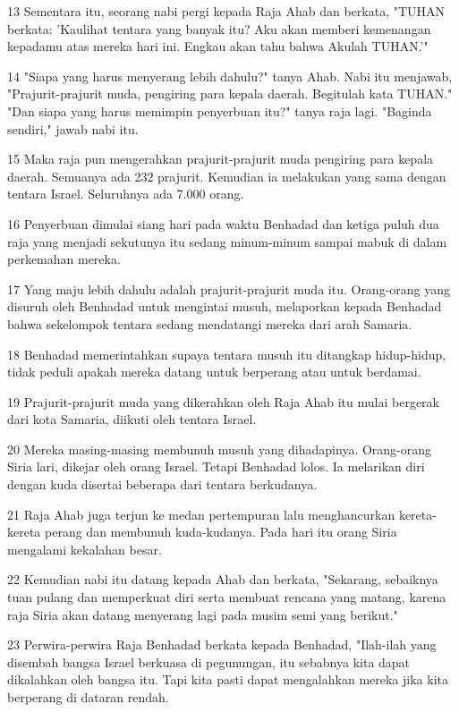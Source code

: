 \par 13 Sementara itu, seorang nabi pergi kepada Raja Ahab dan berkata, "TUHAN berkata: 'Kaulihat tentara yang banyak itu? Aku akan memberi kemenangan kepadamu atas mereka hari ini. Engkau akan tahu bahwa Akulah TUHAN.'"
\par 14 "Siapa yang harus menyerang lebih dahulu?" tanya Ahab. Nabi itu menjawab, "Prajurit-prajurit muda, pengiring para kepala daerah. Begitulah kata TUHAN." "Dan siapa yang harus memimpin penyerbuan itu?" tanya raja lagi. "Baginda sendiri," jawab nabi itu.
\par 15 Maka raja pun mengerahkan prajurit-prajurit muda pengiring para kepala daerah. Semuanya ada 232 prajurit. Kemudian ia melakukan yang sama dengan tentara Israel. Seluruhnya ada 7.000 orang.
\par 16 Penyerbuan dimulai siang hari pada waktu Benhadad dan ketiga puluh dua raja yang menjadi sekutunya itu sedang minum-minum sampai mabuk di dalam perkemahan mereka.
\par 17 Yang maju lebih dahulu adalah prajurit-prajurit muda itu. Orang-orang yang disuruh oleh Benhadad untuk mengintai musuh, melaporkan kepada Benhadad bahwa sekelompok tentara sedang mendatangi mereka dari arah Samaria.
\par 18 Benhadad memerintahkan supaya tentara musuh itu ditangkap hidup-hidup, tidak peduli apakah mereka datang untuk berperang atau untuk berdamai.
\par 19 Prajurit-prajurit muda yang dikerahkan oleh Raja Ahab itu mulai bergerak dari kota Samaria, diikuti oleh tentara Israel.
\par 20 Mereka masing-masing membunuh musuh yang dihadapinya. Orang-orang Siria lari, dikejar oleh orang Israel. Tetapi Benhadad lolos. Ia melarikan diri dengan kuda disertai beberapa dari tentara berkudanya.
\par 21 Raja Ahab juga terjun ke medan pertempuran lalu menghancurkan kereta-kereta perang dan membunuh kuda-kudanya. Pada hari itu orang Siria mengalami kekalahan besar.
\par 22 Kemudian nabi itu datang kepada Ahab dan berkata, "Sekarang, sebaiknya tuan pulang dan memperkuat diri serta membuat rencana yang matang, karena raja Siria akan datang menyerang lagi pada musim semi yang berikut."
\par 23 Perwira-perwira Raja Benhadad berkata kepada Benhadad, "Ilah-ilah yang disembah bangsa Israel berkuasa di pegunungan, itu sebabnya kita dapat dikalahkan oleh bangsa itu. Tapi kita pasti dapat mengalahkan mereka jika kita berperang di dataran rendah.
